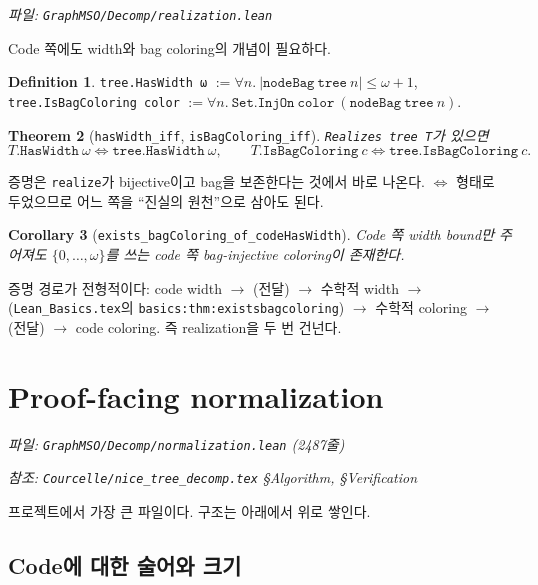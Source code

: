 \documentclass[11pt]{article}
\theoremstyle{definition}
\newtheorem{definition}{Definition}[section]
\theoremstyle{plain}
\newtheorem{theorem}[definition]{Theorem}
\newtheorem{corollary}[definition]{Corollary}
\newcommand{\lean}[1]{\texttt{#1}}
\newcommand{\leanfile}[1]{\texttt{#1}}
\begin{document}
\emph{파일: \leanfile{GraphMSO/Decomp/realization.lean}}

Code 쪽에도 width와 bag coloring의 개념이 필요하다.

\begin{definition}
\label{nice:def:codewidth}
\lean{tree.HasWidth ω} $:= \forall n.\ |\lean{nodeBag}\ \lean{tree}\ n| \le \omega+1$,
\lean{tree.IsBagColoring color} $:= \forall n.\ \lean{Set.InjOn}\ \lean{color}\ (\lean{nodeBag}\ \lean{tree}\ n)$.
\end{definition}

\begin{theorem}[\lean{hasWidth\_iff}, \lean{isBagColoring\_iff}]
\label{nice:thm:transfer}
\lean{Realizes tree T}가 있으면
\[
  T.\lean{HasWidth}\ \omega \iff \lean{tree}.\lean{HasWidth}\ \omega,
  \qquad
  T.\lean{IsBagColoring}\ c \iff \lean{tree}.\lean{IsBagColoring}\ c.
\]
\end{theorem}

증명은 \lean{realize}가 bijective이고 bag을 보존한다는 것에서 바로 나온다.
$\iff$ 형태로 두었으므로 어느 쪽을 ``진실의 원천''으로 삼아도 된다.

\begin{corollary}[\lean{exists\_bagColoring\_of\_codeHasWidth}]
\label{nice:cor:codecoloring}
Code 쪽 width bound만 주어져도 $\{0,\dots,\omega\}$를 쓰는 code 쪽
bag-injective coloring이 존재한다.
\end{corollary}

증명 경로가 전형적이다: code width $\to$ (전달) $\to$ 수학적 width $\to$
(\leanfile{Lean\_Basics.tex}의 \lean{basics:thm:existsbagcoloring}) $\to$
수학적 coloring $\to$ (전달) $\to$ code coloring. 즉 realization을 두 번
건넌다.

\section{Proof-facing normalization}
\label{nice:sec:normalization}

\emph{파일: \leanfile{GraphMSO/Decomp/normalization.lean} (2487줄)}

\emph{참조: \leanfile{Courcelle/nice\_tree\_decomp.tex} \S Algorithm,
\S Verification}

프로젝트에서 가장 큰 파일이다. 구조는 아래에서 위로 쌓인다.

\subsection{Code에 대한 술어와 크기}
\end{document}
